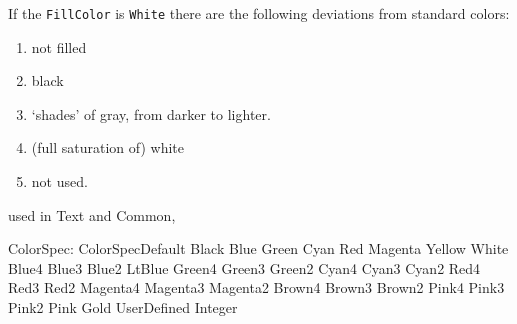 \documentclass[10pt, a4paper, english]{article}%
\begin{document}
If the \texttt{FillColor} is \texttt{White} there are the following deviations 
from standard colors: 
%
\begin{enumerate}
\item[-1]    not filled
\item[0]     black
\item[1--19]  `shades' of gray, from darker to lighter.
\item[20]    (full saturation of) white
\item[21--40] not used. 
\end{enumerate}



used in Text and Common, 

ColorSpec:
ColorSpecDefault	 
Black	 
Blue	 
Green	 
Cyan	 
Red	 
Magenta	 
Yellow	 
White	 
Blue4	 
Blue3	 
Blue2	 
LtBlue	 
Green4	 
Green3	 
Green2	 
Cyan4	 
Cyan3	 
Cyan2	 
Red4	 
Red3	 
Red2	 
Magenta4	 
Magenta3	 
Magenta2	 
Brown4	 
Brown3	 
Brown2	 
Pink4	 
Pink3	 
Pink2	 
Pink	 
Gold	 
UserDefined Integer	 


{}%
\end{document}
